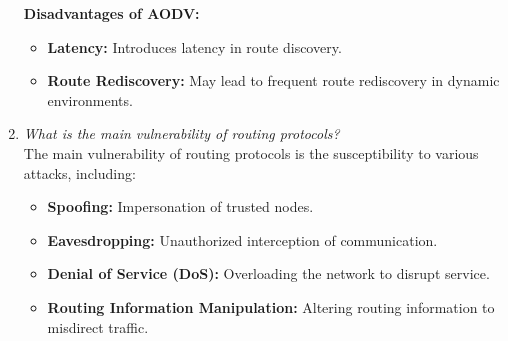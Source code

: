 \documentclass[11pt]{article}
\begin{document}
\begin{enumerate}
          \textbf{Disadvantages of AODV:}
          \begin{itemize}
              \item \textbf{Latency:} Introduces latency in route discovery.
              \item \textbf{Route Rediscovery:} May lead to frequent route rediscovery in dynamic environments.
          \end{itemize}

    \item \textit{What is the main vulnerability of routing protocols?}\\

          The main vulnerability of routing protocols is the susceptibility to various attacks, including:
          \begin{itemize}
              \item \textbf{Spoofing:} Impersonation of trusted nodes.
              \item \textbf{Eavesdropping:} Unauthorized interception of communication.
              \item \textbf{Denial of Service (DoS):} Overloading the network to disrupt service.
              \item \textbf{Routing Information Manipulation:} Altering routing information to misdirect traffic.
          \end{itemize}

\end{enumerate}
\end{document}
